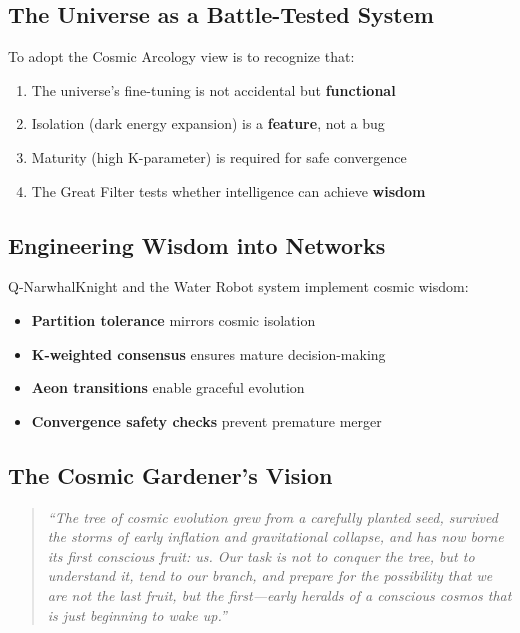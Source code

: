 \documentclass[12pt,a4paper]{article}
\begin{document}
\subsection{The Universe as a Battle-Tested System}

To adopt the Cosmic Arcology view is to recognize that:
\begin{enumerate}
    \item The universe's fine-tuning is not accidental but \textbf{functional}
    \item Isolation (dark energy expansion) is a \textbf{feature}, not a bug
    \item Maturity (high K-parameter) is required for safe convergence
    \item The Great Filter tests whether intelligence can achieve \textbf{wisdom}
\end{enumerate}

\subsection{Engineering Wisdom into Networks}

Q-NarwhalKnight and the Water Robot system implement cosmic wisdom:
\begin{itemize}
    \item \textbf{Partition tolerance} mirrors cosmic isolation
    \item \textbf{K-weighted consensus} ensures mature decision-making
    \item \textbf{Aeon transitions} enable graceful evolution
    \item \textbf{Convergence safety checks} prevent premature merger
\end{itemize}

\subsection{The Cosmic Gardener's Vision}

\begin{quote}
\textit{``The tree of cosmic evolution grew from a carefully planted seed, survived the storms
of early inflation and gravitational collapse, and has now borne its first conscious fruit: us.
Our task is not to conquer the tree, but to understand it, tend to our branch, and prepare
for the possibility that we are not the last fruit, but the first---early heralds of a
conscious cosmos that is just beginning to wake up.''}
\end{quote}
\end{document}
